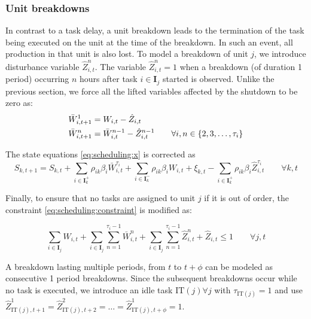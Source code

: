\subsubsection{Unit breakdowns}
In contrast to a  task delay, a unit breakdown leads to the termination of the
task being executed on the unit at the time of the breakdown. In such
an event, all production in that unit is also lost.  To model a breakdown of unit $j$, we introduce
disturbance variable $\hat{Z}_{i,t}^{n}$. The variable
$\hat{Z}_{i,t}^{n} = 1$ when a breakdown (of duration 1 period)
occurring $n$ hours after task $i \in \mathbf{I}_j$ started is observed.
Unlike the previous section, we force all the lifted variables
affected by the shutdown to be zero as:
\begin{align}
\label{eq:scheduling:breakdown_W}
\bar{W}_{i,t+1}^{1} &= W_{i,t} - \hat{Z}_{i,t} \nonumber\\
\bar{W}_{i,t+1}^{n} &= \bar{W}_{i,t}^{n-1} - \hat{Z}_{i,t}^{n-1} \qquad
\forall i, n \in \left\lbrace 2,3,\ldots,\tau_i \right\rbrace
\end{align}

The  state equations \eqref{eq:scheduling:x} is corrected as
\begin{equation}
\label{eq:scheduling:breakdown_S}
S_{k,t+1} = S_{k,t} + \sum_{i \in
  \mathbf{I}_k^+}\rho_{ik}\beta_i\bar{W}_{i,t}^{\tau_i} + \sum_{i\in
  \mathbf{I}_k^-}\rho_{ik}\beta_iW_{i,t}+ \xi_{k,t} - \sum_{i\in
  \mathbf{I}_k^+}\rho_{ik}\beta_i\hat{Z}_{i,t}^{\tau_i}    \qquad \forall k,t
\end{equation}

Finally, to ensure that no tasks are assigned to unit $j$ if it is out
of order, the constraint \eqref{eq:scheduling:constraint} is modified as:

\begin{equation}
\label{eq:scheduling:breakdown_constraint}
\sum_{i \in \mathbf{I}_j} W_{i,t} + \sum_{i \in \mathbf{I}_j}
\sum_{n=1}^{\tau_i-1}\bar{W}_{i,t}^{n} +\sum_{i \in \mathbf{I}_j}
\sum_{n=1}^{\tau_i-1}\hat{Z}_{i,t}^{n}  + \hat{Z}_{i,t} \leq 
1 \qquad \forall j,t
\end{equation}

A breakdown lasting multiple periods, from $t$ to $t+\phi$ can be
modeled as consecutive 1 period breakdowns. Since the subsequent
breakdowns occur while no task is executed, we introduce an idle task
$\text{IT}(j) \forall j$ with $ \tau_{\text{IT}(j)} = 1$ and use
$\hat{Z}_{\text{IT}(j),t+1}^{1} = \hat{Z}_{\text{IT}(j),t+2}^{2} =
\ldots = \hat{Z}_{\text{IT}(j),t+\phi}^{1} = 1$. 

